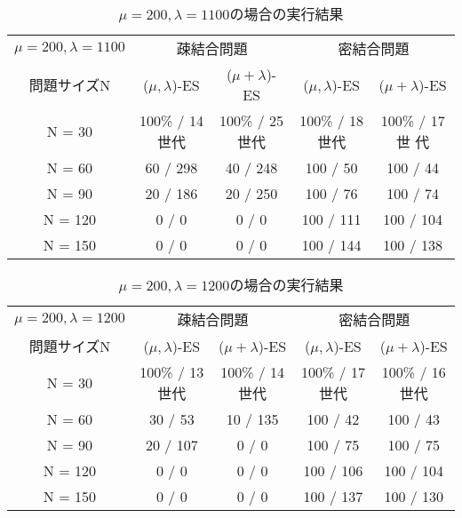 \documentclass[a4j]{jarticle}
\begin{document}
\begin{table}[htb]
 \begin{center}
  \begin{tabular}[tb]{|c||c|c||c|c|} \hline
   $\mu = 200, \lambda = 1100$& \multicolumn{2}{c||}{疎結合問題} &
   \multicolumn{2}{c|}{密結合問題} \\ \cline{2-5}
   問題サイズN& ($\mu, \lambda$)-ES& ($\mu + \lambda$)-ES& ($\mu, \lambda$)-ES&
   ($\mu + \lambda$)-ES \\ \hline \hline
   N = 30& 100\% / 14世代& 100\% / 25世代& 100\% / 18世代& 100\% / 17世
   代\\ \hline
   N = 60& 60 / 298& 40 / 248& 100 / 50& 100 / 44\\ \hline
   N = 90& 20 / 186&20 / 250 & 100 / 76& 100 / 74\\ \hline
   N = 120& 0 / 0&0 / 0 & 100 / 111& 100 / 104\\ \hline
   N = 150& 0 / 0&0 / 0 & 100 / 144& 100 / 138\\ \hline
  \end{tabular}
  \caption{$\mu = 200, \lambda = 1100$の場合の実行結果}
  \label{211}
 \end{center}
\end{table}

\begin{table}[htb]
 \begin{center}
  \begin{tabular}[tb]{|c||c|c||c|c|} \hline
   $\mu = 200, \lambda = 1200$& \multicolumn{2}{c||}{疎結合問題} &
   \multicolumn{2}{c|}{密結合問題} \\ \cline{2-5}
   問題サイズN& ($\mu, \lambda$)-ES& ($\mu + \lambda$)-ES& ($\mu, \lambda$)-ES&
   ($\mu + \lambda$)-ES \\ \hline \hline
   N = 30& 100\% / 13世代& 100\% / 14世代& 100\% / 17世代&100\% / 16世代 \\ \hline
   N = 60& 30 / 53& 10 / 135& 100 / 42& 100 / 43\\ \hline
   N = 90& 20 / 107&0 / 0 &100 / 75 &100 / 75 \\ \hline
   N = 120& 0 / 0&0 / 0 & 100 / 106& 100 / 104\\ \hline
   N = 150& 0 / 0&0 / 0 & 100 / 137& 100 / 130\\ \hline
  \end{tabular}
  \caption{$\mu = 200, \lambda = 1200$の場合の実行結果}
  \label{212}
 \end{center}
\end{table}
\end{document}
